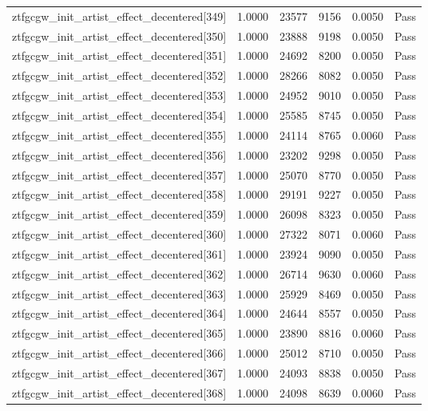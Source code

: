 \begin{table}[htbp]
\begin{tabular}{llrrll}
ztfgcgw\_init\_artist\_effect\_decentered[349] & 1.0000 & 23577 & 9156 & 0.0050 & Pass \\
ztfgcgw\_init\_artist\_effect\_decentered[350] & 1.0000 & 23888 & 9198 & 0.0050 & Pass \\
ztfgcgw\_init\_artist\_effect\_decentered[351] & 1.0000 & 24692 & 8200 & 0.0050 & Pass \\
ztfgcgw\_init\_artist\_effect\_decentered[352] & 1.0000 & 28266 & 8082 & 0.0050 & Pass \\
ztfgcgw\_init\_artist\_effect\_decentered[353] & 1.0000 & 24952 & 9010 & 0.0050 & Pass \\
ztfgcgw\_init\_artist\_effect\_decentered[354] & 1.0000 & 25585 & 8745 & 0.0050 & Pass \\
ztfgcgw\_init\_artist\_effect\_decentered[355] & 1.0000 & 24114 & 8765 & 0.0060 & Pass \\
ztfgcgw\_init\_artist\_effect\_decentered[356] & 1.0000 & 23202 & 9298 & 0.0050 & Pass \\
ztfgcgw\_init\_artist\_effect\_decentered[357] & 1.0000 & 25070 & 8770 & 0.0050 & Pass \\
ztfgcgw\_init\_artist\_effect\_decentered[358] & 1.0000 & 29191 & 9227 & 0.0050 & Pass \\
ztfgcgw\_init\_artist\_effect\_decentered[359] & 1.0000 & 26098 & 8323 & 0.0050 & Pass \\
ztfgcgw\_init\_artist\_effect\_decentered[360] & 1.0000 & 27322 & 8071 & 0.0060 & Pass \\
ztfgcgw\_init\_artist\_effect\_decentered[361] & 1.0000 & 23924 & 9090 & 0.0050 & Pass \\
ztfgcgw\_init\_artist\_effect\_decentered[362] & 1.0000 & 26714 & 9630 & 0.0060 & Pass \\
ztfgcgw\_init\_artist\_effect\_decentered[363] & 1.0000 & 25929 & 8469 & 0.0050 & Pass \\
ztfgcgw\_init\_artist\_effect\_decentered[364] & 1.0000 & 24644 & 8557 & 0.0050 & Pass \\
ztfgcgw\_init\_artist\_effect\_decentered[365] & 1.0000 & 23890 & 8816 & 0.0060 & Pass \\
ztfgcgw\_init\_artist\_effect\_decentered[366] & 1.0000 & 25012 & 8710 & 0.0050 & Pass \\
ztfgcgw\_init\_artist\_effect\_decentered[367] & 1.0000 & 24093 & 8838 & 0.0050 & Pass \\
ztfgcgw\_init\_artist\_effect\_decentered[368] & 1.0000 & 24098 & 8639 & 0.0060 & Pass \\

\end{tabular}
\end{table}
